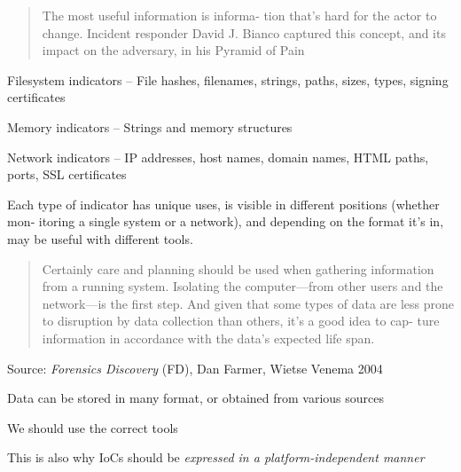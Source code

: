 \documentclass[Screen16to9,17pt]{foils}
\begin{document}
\begin{quote}
The most useful information is informa‐
tion that’s hard for the actor to change. Incident responder David J. Bianco captured
this concept, and its impact on the adversary, in his Pyramid of Pain
\end{quote}


\begin{list2}
\item Filesystem indicators -- File hashes, filenames, strings, paths, sizes, types, signing certificates
\item Memory indicators -- Strings and memory structures
\item Network indicators -- IP addresses, host names, domain names, HTML paths, ports, SSL certificates
\end{list2}
Each type of indicator has unique uses, is visible in different positions (whether mon‐
itoring a single system or a network), and depending on the format it’s in, may be
useful with different tools.



\begin{quote}\small
Certainly care and planning should be used when gathering information
from a running system. Isolating the computer—from other users and the
network—is the first step. And given that some types of data are less
prone to disruption by data collection than others, it’s a good idea to cap-
ture information in accordance with the data’s expected life span.
\end{quote}{\footnotesize
Source: \emph{Forensics Discovery} (FD), Dan Farmer, Wietse Venema 2004}




\begin{list2}
\item Data can be stored in many format, or obtained from various sources
\item We should use the correct tools
\item This is also why IoCs should be \emph{expressed in a platform-independent manner}
\end{list2}
\end{document}
